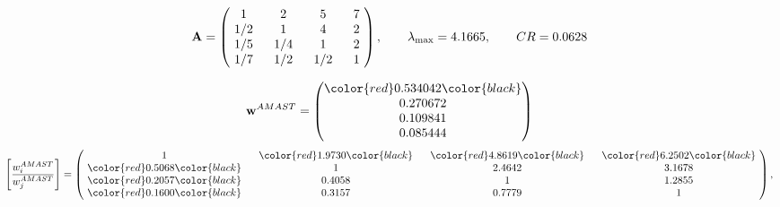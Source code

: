 \begin{example}
\begin{equation*}
\mathbf{A} =
\begin{pmatrix}
$\,\,$ 1 $\,\,$ & $\,\,$2$\,\,$ & $\,\,$5$\,\,$ & $\,\,$7 $\,\,$ \\
$\,\,$ 1/2$\,\,$ & $\,\,$ 1 $\,\,$ & $\,\,$4$\,\,$ & $\,\,$2 $\,\,$ \\
$\,\,$ 1/5$\,\,$ & $\,\,$ 1/4$\,\,$ & $\,\,$ 1 $\,\,$ & $\,\,$2 $\,\,$ \\
$\,\,$ 1/7$\,\,$ & $\,\,$ 1/2$\,\,$ & $\,\,$ 1/2$\,\,$ & $\,\,$ 1  $\,\,$ \\
\end{pmatrix},
\qquad
\lambda_{\max} =
4.1665,
\qquad
CR = 0.0628
\end{equation*}

\begin{equation*}
\mathbf{w}^{AMAST} =
\begin{pmatrix}
\color{red} 0.534042\color{black} \\
0.270672\\
0.109841\\
0.085444
\end{pmatrix}\end{equation*}
\begin{equation*}
\left[ \frac{{w}^{AMAST}_i}{{w}^{AMAST}_j} \right] =
\begin{pmatrix}
$\,\,$ 1 $\,\,$ & $\,\,$\color{red} 1.9730\color{black} $\,\,$ & $\,\,$\color{red} 4.8619\color{black} $\,\,$ & $\,\,$\color{red} 6.2502\color{black} $\,\,$ \\
$\,\,$\color{red} 0.5068\color{black} $\,\,$ & $\,\,$ 1 $\,\,$ & $\,\,$2.4642$\,\,$ & $\,\,$3.1678  $\,\,$ \\
$\,\,$\color{red} 0.2057\color{black} $\,\,$ & $\,\,$0.4058$\,\,$ & $\,\,$ 1 $\,\,$ & $\,\,$1.2855 $\,\,$ \\
$\,\,$\color{red} 0.1600\color{black} $\,\,$ & $\,\,$0.3157$\,\,$ & $\,\,$0.7779$\,\,$ & $\,\,$ 1  $\,\,$ \\
\end{pmatrix},
\end{equation*}


\end{example}
